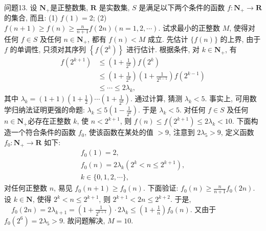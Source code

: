 问题13. 设 $\mathbf{N}_{+}$是正整数集, $\mathbf{R}$ 是实数集, $S$ 是满足以下两个条件的函数 $f: \mathbf{N}_{+} \rightarrow \mathbf{R}$的集合, 而且:
(1) $f(1)=2$;
(2) $f(n+1) \geqslant f(n) \geqslant \frac{n}{n+1} f(2 n)(n=1,2, \cdots)$.
试求最小的正整数 $M$, 使得对任何 $f \in S$ 及任何 $n \in \mathbf{N}_{+}$, 都有 $f(n)<M$ 成立.
先估计 $\{f(n)\}$ 的上界, 由于 $f$ 的单调性, 只须对其序列 $\left\{f\left(2^k\right)\right\}$ 进行估计.
根据条件, 对 $k \in \mathbf{N}_{+}$, 有
$$
\begin{aligned}
f\left(2^{k+1}\right) & \leqslant\left(1+\frac{1}{2^k}\right) f\left(2^k\right) \\
& \leqslant\left(1+\frac{1}{2^k}\right)\left(1+\frac{1}{2^{k-1}}\right) f\left(2^{k-1}\right) \\
& \leqslant \cdots \leqslant 2 \lambda_k,
\end{aligned}
$$
其中 $\lambda_k=(1+1)\left(1+\frac{1}{2}\right) \cdots\left(1+\frac{1}{2^k}\right)$.
通过计算, 猜测 $\lambda_k<5$. 事实上, 可用数学归纳法证明更强的命题: $\lambda_k \leqslant 5\left(1-\frac{1}{2^k}\right)$. 于是 $\lambda_k<5$. 对任何 $f \in S$ 及任何 $n \in \mathbf{N}_{+}$必存在正整数 $k$, 使 $n< 2^{k+1}$, 则 $f(n) \leqslant f\left(2^{k+1}\right) \leqslant 2 \lambda_k<10$.
下面构造一个符合条件的函数 $f_0$, 使该函数在某处的值 $>9$, 注意到 $2 \lambda_5>9$, 定义函数 $f_0: \mathbf{N}_{+} \rightarrow \mathbf{R}$ 如下:
$$
\begin{gathered}
f_0(1)=2, \\
f_0(n)=2 \lambda_k\left(2^k<n \leqslant 2^{k+1}\right), \\
k \in\{0,1,2, \cdots\},
\end{gathered}
$$
对任何正整数 $n$, 易见 $f_0(n+1) \geqslant f_0(n)$. 下面验证: $f_0(n) \geqslant \frac{n}{n+1} f_0(2 n)$.
设 $k \in \mathbf{N}$, 使得 $2^k<n \leqslant 2^{k+1}$, 则 $2^{k+1}<2 n \leqslant 2^{k+2}$.
于是, $\quad f_0(2 n)=2 \lambda_{k+1}=\left(1+\frac{1}{2^{k+1}}\right) \cdot 2 \lambda_k \leqslant\left(1+\frac{1}{n}\right) f_0(n)$.
又由于 $f_0\left(2^6\right)=2 \lambda_5>9$. 故问题解决, $M=10$.



